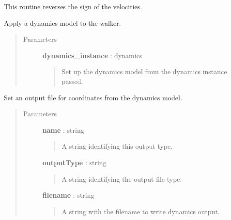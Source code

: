 \documentclass[letterpaper,10pt,english]{sphinxmanual}
\begin{document}
\begin{fulllineitems}
\begin{fulllineitems}
This routine reverses the sign of the velocities.

\end{fulllineitems}


\begin{fulllineitems}
\label{walker_api/walker_api.doc:walker_api.lammps_walker.Lammps.set_dynamics}
Apply a dynamics model to the walker.
\begin{quote}\begin{description}
\item[{Parameters}] \leavevmode
\textbf{dynamics\_instance} : dynamics
\begin{quote}

Set up the dynamics model from the dynamics instance passed.
\end{quote}

\end{description}\end{quote}

\end{fulllineitems}


\begin{fulllineitems}
\label{walker_api/walker_api.doc:walker_api.lammps_walker.Lammps.set_output}
Set an output file for coordinates from the dynamics model.
\begin{quote}\begin{description}
\item[{Parameters}] \leavevmode
\textbf{name} : string
\begin{quote}

A string identifying this output type.
\end{quote}

\textbf{outputType} : string
\begin{quote}

A string identifying the output file type.
\end{quote}

\textbf{filename} : string
\begin{quote}

A string with the filename to write dynamics output.
\end{quote}


\end{description}
\end{quote}
\end{fulllineitems}
\end{fulllineitems}
\end{document}
